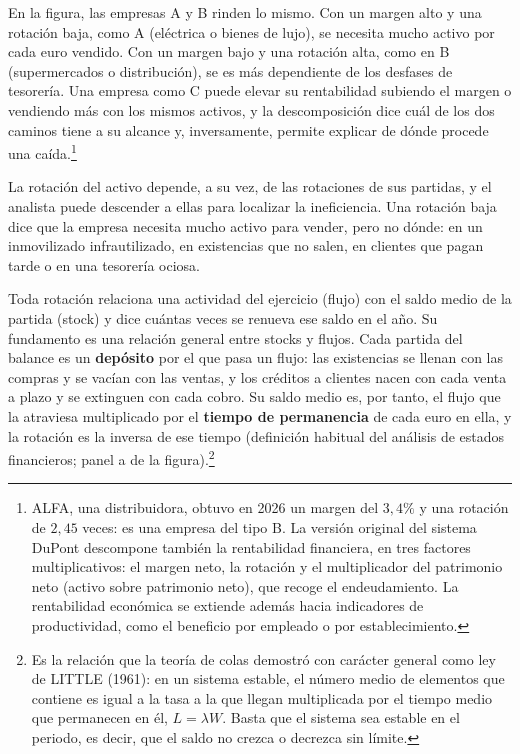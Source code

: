 \documentclass[10pt,a4paper]{article}
\begin{document}
En la figura, las empresas A y B rinden lo mismo. Con un margen alto y una rotación baja, como A (eléctrica o bienes de lujo), se necesita mucho activo por cada euro vendido. Con un margen bajo y una rotación alta, como en B (supermercados o distribución), se es más dependiente de los desfases de tesorería. Una empresa como C puede elevar su rentabilidad subiendo el margen o vendiendo más con los mismos activos, y la descomposición dice cuál de los dos caminos tiene a su alcance y, inversamente, permite explicar de dónde procede una caída.\footnote{%
    ALFA, una distribuidora, obtuvo en 2026 un margen del $3{,}4\%$ y una rotación de $2{,}45$ veces: es una empresa del tipo B. La versión original del sistema DuPont descompone también la rentabilidad financiera, en tres factores multiplicativos: el margen neto, la rotación y el multiplicador del patrimonio neto (activo sobre patrimonio neto), que recoge el endeudamiento. La rentabilidad económica se extiende además hacia indicadores de productividad, como el beneficio por empleado o por establecimiento.
}

La rotación del activo depende, a su vez, de las rotaciones de sus partidas, y el analista puede descender a ellas para localizar la ineficiencia. Una rotación baja dice que la empresa necesita mucho activo para vender, pero no dónde: en un inmovilizado infrautilizado, en existencias que no salen, en clientes que pagan tarde o en una tesorería ociosa.

Toda rotación relaciona una actividad del ejercicio (flujo) con el saldo medio de la partida (stock) y dice cuántas veces se renueva ese saldo en el año. Su fundamento es una relación general entre stocks y flujos. Cada partida del balance es un \textbf{depósito} por el que pasa un flujo: las existencias se llenan con las compras y se vacían con las ventas, y los créditos a clientes nacen con cada venta a plazo y se extinguen con cada cobro. Su saldo medio es, por tanto, el flujo que la atraviesa multiplicado por el \textbf{tiempo de permanencia} de cada euro en ella, y la rotación es la inversa de ese tiempo (definición habitual del análisis de estados financieros; panel a de la figura).\footnote{%
    Es la relación que la teoría de colas demostró con carácter general como ley de LITTLE (1961): en un sistema estable, el número medio de elementos que contiene es igual a la tasa a la que llegan multiplicada por el tiempo medio que permanecen en él, $L=\lambda W$. Basta que el sistema sea estable en el periodo, es decir, que el saldo no crezca o decrezca sin límite.
}
\end{document}
